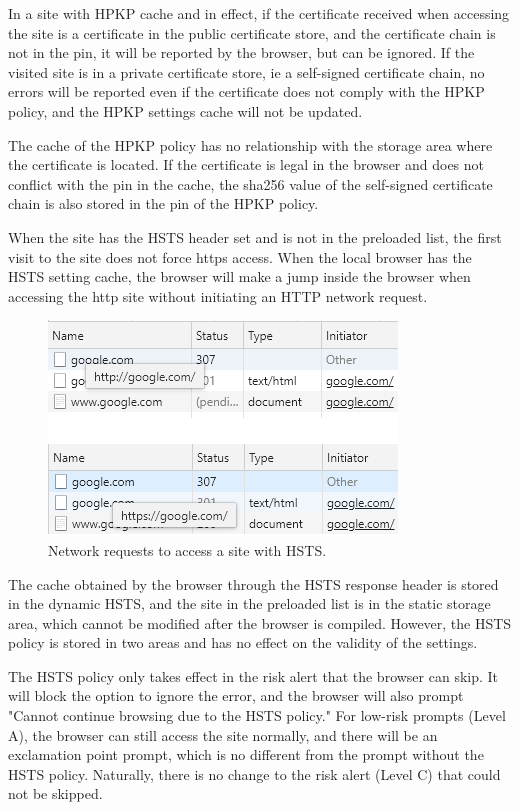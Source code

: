 In a site with HPKP cache and in effect, if the certificate received when accessing the site is a certificate in the public certificate store, and the certificate chain is not in the pin, it will be reported by the browser, but can be ignored. If the visited site is in a private certificate store, ie a self-signed certificate chain, no errors will be reported even if the certificate does not comply with the HPKP policy, and the HPKP settings cache will not be updated.

The cache of the HPKP policy has no relationship with the storage area where the certificate is located. If the certificate is legal in the browser and does not conflict with the pin in the cache, the sha256 value of the self-signed certificate chain is also stored in the pin of the HPKP policy.

When the site has the HSTS header set and is not in the preloaded list, the first visit to the site does not force https access. When the local browser has the HSTS setting cache, the browser will make a jump inside the browser when accessing the http site without initiating an HTTP network request.

\begin{figure}[htbp]
\centerline{\includegraphics{Figure/fig5.png}}
\caption{Network requests to access a site with HSTS.}
\label{fig}
\end{figure}

The cache obtained by the browser through the HSTS response header is stored in the dynamic HSTS, and the site in the preloaded list is in the static storage area, which cannot be modified after the browser is compiled. However, the HSTS policy is stored in two areas and has no effect on the validity of the settings.

The HSTS policy only takes effect in the risk alert that the browser can skip. It will block the option to ignore the error, and the browser will also prompt "Cannot continue browsing due to the HSTS policy." For low-risk prompts (Level A), the browser can still access the site normally, and there will be an exclamation point prompt, which is no different from the prompt without the HSTS policy. Naturally, there is no change to the risk alert (Level C) that could not be skipped.

